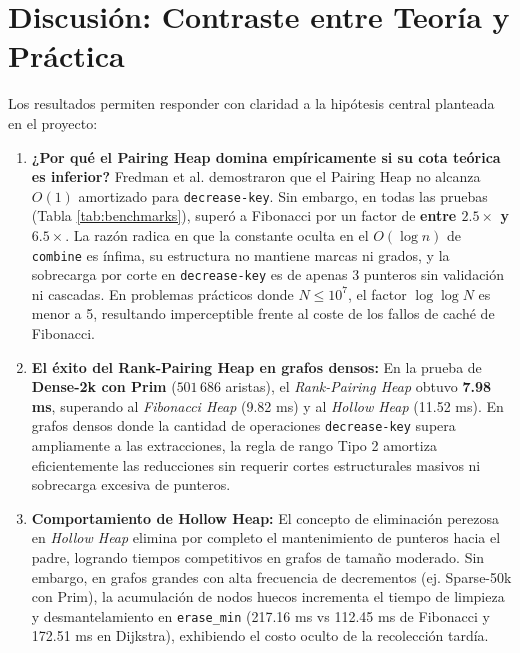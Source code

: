 \documentclass[11pt,a4paper]{article}
\begin{document}
\section{Discusión: Contraste entre Teoría y Práctica}

Los resultados permiten responder con claridad a la hipótesis central planteada en el proyecto:

\begin{enumerate}
    \item \textbf{¿Por qué el Pairing Heap domina empíricamente si su cota teórica es inferior?}
    Fredman et al. demostraron que el Pairing Heap no alcanza $O(1)$ amortizado para \texttt{decrease-key}. Sin embargo, en todas las pruebas (Tabla \ref{tab:benchmarks}), superó a Fibonacci por un factor de \textbf{entre $2.5\times$ y $6.5\times$}. La razón radica en que la constante oculta en el $O(\log n)$ de \texttt{combine} es ínfima, su estructura no mantiene marcas ni grados, y la sobrecarga por corte en \texttt{decrease-key} es de apenas 3 punteros sin validación ni cascadas. En problemas prácticos donde $N \le 10^7$, el factor $\log \log N$ es menor a 5, resultando imperceptible frente al coste de los fallos de caché de Fibonacci.

    \item \textbf{El éxito del Rank-Pairing Heap en grafos densos:}
    En la prueba de \textbf{Dense-2k con Prim} ($501\,686$ aristas), el \textit{Rank-Pairing Heap} obtuvo \textbf{7.98 ms}, superando al \textit{Fibonacci Heap} (9.82 ms) y al \textit{Hollow Heap} (11.52 ms). En grafos densos donde la cantidad de operaciones \texttt{decrease-key} supera ampliamente a las extracciones, la regla de rango Tipo 2 amortiza eficientemente las reducciones sin requerir cortes estructurales masivos ni sobrecarga excesiva de punteros.
    
    \item \textbf{Comportamiento de Hollow Heap:}
    El concepto de eliminación perezosa en \textit{Hollow Heap} elimina por completo el mantenimiento de punteros hacia el padre, logrando tiempos competitivos en grafos de tamaño moderado. Sin embargo, en grafos grandes con alta frecuencia de decrementos (ej. Sparse-50k con Prim), la acumulación de nodos huecos incrementa el tiempo de limpieza y desmantelamiento en \texttt{erase\_min} (217.16 ms vs 112.45 ms de Fibonacci y 172.51 ms en Dijkstra), exhibiendo el costo oculto de la recolección tardía.
\end{enumerate}
\end{document}
